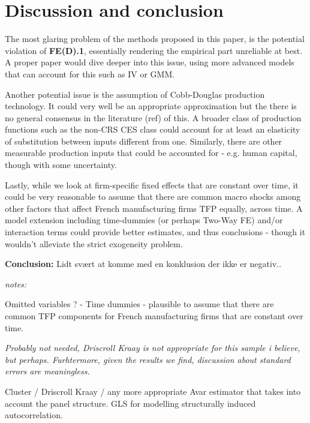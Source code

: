 \section{Discussion and conclusion}

The most glaring problem of the methods proposed in this paper, is the potential violation of \textbf{FE(D).1}, essentially rendering the empirical part unreliable at best. A proper paper would dive deeper into this issue, using more advanced models that can account for this such as IV or GMM. 

Another potential issue is the assumption of Cobb-Douglas production technology. It could very well be an appropriate approximation but the there is no general consensus in the literature (ref) of this. A broader class of production functions such as the non-CRS CES class could account for at least an elasticity of substitution between inputs different from one. Similarly, there are other measurable production inputs that could be accounted for - e.g. human capital, though with some uncertainty. 

Lastly, while we look at firm-specific fixed effects that are constant over time, it could be very reasonable to assume that there are common macro shocks among other factors that affect French manufacturing firms TFP equally, across time. A model extension including time-dummies (or perhaps Two-Way FE) and/or interaction terms could provide better estimates, and thus conclusions - though it wouldn't alleviate the strict exogeneity problem. 

\textbf{Conclusion:} Lidt svært at komme med en konklusion der ikke er negativ.. 

\textit{notes:}

Omitted variables ? - Time dummies -\> plausible to assume that there are common TFP components for French manufacturing firms that are constant over time.

\textit{Probably not needed, Driscroll Kraay is not appropriate for this sample i believe, but perhaps. Furhtermore, given the results we find, discussion about standard errors are meaningless. }

Cluster / Driscroll Kraay / any more appropriate Avar estimator that takes into account the panel structure. GLS for modelling structurally induced autocorrelation.  